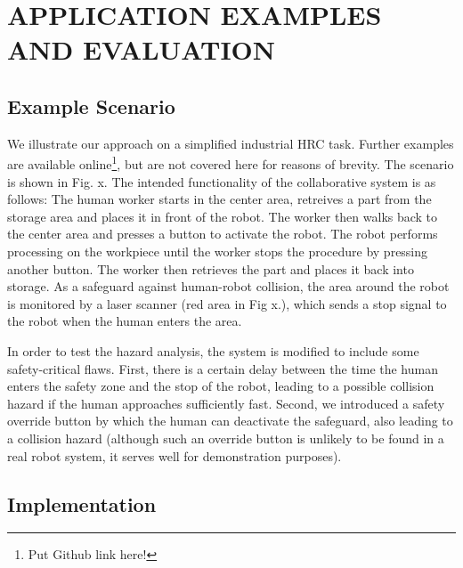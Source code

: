 \documentclass[letterpaper, 10 pt, conference]{ieeeconf}  %
\begin{document}
\section{APPLICATION EXAMPLES AND EVALUATION}

\subsection{Example Scenario}
We illustrate our approach on a simplified industrial HRC task. Further examples are available online\footnote{Put Github link here!}, but are not covered here for reasons of brevity. The scenario is shown in Fig. x. The intended functionality of the collaborative system is as follows: The human worker starts in the center area, retreives a part from the storage area and places it in front of the robot. The worker then walks back to the center area and presses a button to activate the robot. The robot performs processing on the workpiece until the worker stops the procedure by pressing another button. The worker then retrieves the part and places it back into storage. As a safeguard against human-robot collision, the area around the robot is monitored by a laser scanner (red area in Fig x.), which sends a stop signal to the robot when the human enters the area.

In order to test the hazard analysis, the system is modified to include some safety-critical flaws. First, there is a certain delay between the time the human enters the safety zone and the stop of the robot, leading to a possible collision hazard if the human approaches sufficiently fast. Second, we introduced a safety override button by which the human can deactivate the safeguard, also leading to a collision hazard (although such an override button is unlikely to be found in a real robot system, it serves well for demonstration purposes).

\subsection{Implementation}
\end{document}
